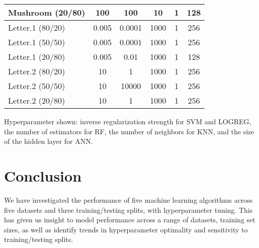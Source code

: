 \documentclass{article}
\begin{document}
\begin{table}
\begin{tabular}{l|c|c|c|c|c}
		Mushroom (20/80)          & 100                      & 100                         & 10                      & 1                        & 128                     \\
		\midrule Letter.1 (80/20) & 0.005                    & 0.0001                      & 1000                    & 1                        & 256                     \\
		Letter.1 (50/50)          & 0.005                    & 0.0001                      & 1000                    & 1                        & 256                     \\
		Letter.1 (20/80)          & 0.005                    & 0.01                        & 1000                    & 1                        & 128                     \\
		\midrule Letter.2 (80/20) & 10                       & 1                           & 1000                    & 1                        & 256                     \\
		Letter.2 (50/50)          & 10                       & 10000                       & 1000                    & 1                        & 256                     \\
		Letter.2 (20/80)          & 10                       & 1                           & 1000                    & 1                        & 256                     \\
		\bottomrule
	\end{tabular}
	\begin{minipage}{9.5cm}
		\vspace{0.1cm}

		\small Hyperparameter shown: inverse regularization strength for SVM and
		LOGREG, the number of estimators for RF, the number of neighbors for KNN,
		and the size of the hidden layer for ANN.
	\end{minipage}
\end{table}


\section{Conclusion}

We have investigated the performance of five machine learning algorithms across
five datasets and three training/testing splits, with hyperparameter tuning.
This has given us insight to model performance across a range of datasets,
training set sizes, as well as identify trends in hyperparameter optimality and
sensitivity to training/testing splits.
\end{document}
